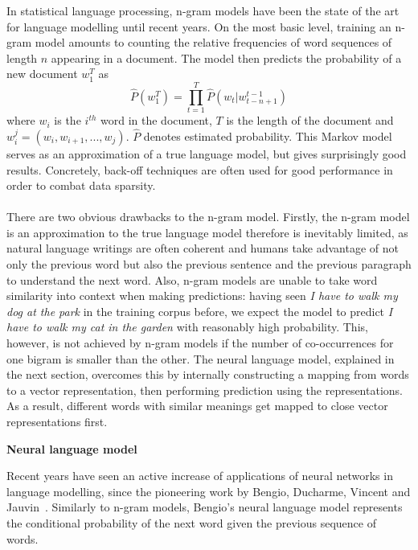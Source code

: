 \documentclass[a4paper,12pt,twoside,openright]{report}
\newcommand{\tb}{\vspace{10pt} \textbf}
\newcommand{\ti}{\textit}
\newcommand{\nl}{\\ \\}
\begin{document}
In statistical language processing, n-gram models have been the state of the art for language modelling until recent years. On the most basic level, training an n-gram model amounts to counting the relative frequencies of word sequences of length $n$ appearing in a document. The model then predicts the probability of a new document $w_1^T$ as
\begin{equation}
\hat{P}(w_1^T)=\prod_{t=1}^T{\hat{P}(w_t|w_{t-n+1}^{t-1})}
\label{ch1:nnlm}
\end{equation}
\noindent where $w_i$ is the $i^{th}$ word in the document, $T$ is the length of the document and $w_i^j = (w_i, w_{i+1}, ..., w_j)$. $\hat{P}$ denotes estimated probability. This Markov model serves as an approximation of a true language model, but gives surprisingly good results. Concretely, back-off techniques are often used for good performance in order to combat data sparsity.
\nl
There are two obvious drawbacks to the n-gram model. Firstly, the n-gram model is an approximation to the true language model therefore is inevitably limited, as natural language writings are often coherent and humans take advantage of not only the previous word but also the previous sentence and the previous paragraph to understand the next word. Also, n-gram models are unable to take word similarity into context when making predictions: having seen \ti{I have to walk my dog at the park} in the training corpus before, we expect the model to predict \ti{I have to walk my cat in the garden} with reasonably high probability. This, however, is not achieved by n-gram models if the number of co-occurrences for one bigram is smaller than the other. The neural language model, explained in the next section, overcomes this by internally constructing a mapping from words to a vector representation, then performing prediction using the representations. As a result, different words with similar meanings get mapped to close vector representations first.

\tb{Neural language model}

Recent years have seen an active increase of applications of neural networks in language modelling, since the pioneering work by Bengio, Ducharme, Vincent and Jauvin~\cite{bengio03}. Similarly to n-gram models, Bengio's neural language model represents the conditional probability of the next word given the previous sequence of words. 
\end{document}
